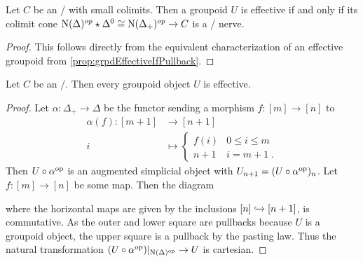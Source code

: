 \begin{corollary}\label{cor:groupoidEffectiveIffColimCechNerve}
    Let $C$ be an \inftycat/ with small colimits. 
    Then a groupoid $U$ is effective if and only if its colimit cone $\operatorname{N}(\Delta)^{op}\star\Delta^0\cong\operatorname{N}(\Delta_+)^{op}\to C$ is a \Cech/ nerve.
    \begin{proof}
        This follows directly from the equivalent characterization of an effective groupoid from \cref{prop:grpdEffectiveIfPullback}.
    \end{proof}
\end{corollary}
\begin{prop}\label{prop:groupoidObjInToposAreEffective} %
    Let $C$ be an \inftytop/.
    Then every groupoid object $U$ is effective.
    \begin{proof}
        Let $\alpha\colon\Delta_+\to\Delta$ be the functor sending a morphism $f\colon [m]\to[n]$ to 
        \begin{align*}
            \alpha(f)\colon [m+1]&\to[n+1]\\
            i&\mapsto
            \begin{cases}
                f(i) & 0\leq i\leq m\\
                n+1 & i=m+1\;.
            \end{cases}
        \end{align*}
        Then $U\circ\alpha^{\operatorname{op}}$ is an augmented simplicial object with $U_{n+1}=(U\circ\alpha^{\operatorname{op}})_n$.
        Let $f\colon [m]\to[n]$ be some map. Then the diagram
        \begin{center}
        \end{center}
        where the horizontal maps are given by the inclusions $[n]\xhookrightarrow{}[n+1]$, is commutative. 
        As the outer and lower square are pullbacks because $U$ is a groupoid object, the upper square is a pullback by the pasting law.
        Thus the natural transformation $(U\circ\alpha^{\operatorname{op}})|_{\operatorname{N}(\Delta)^{\operatorname{op}}}\to U$ is cartesian.


\end{proof}
\end{prop}
